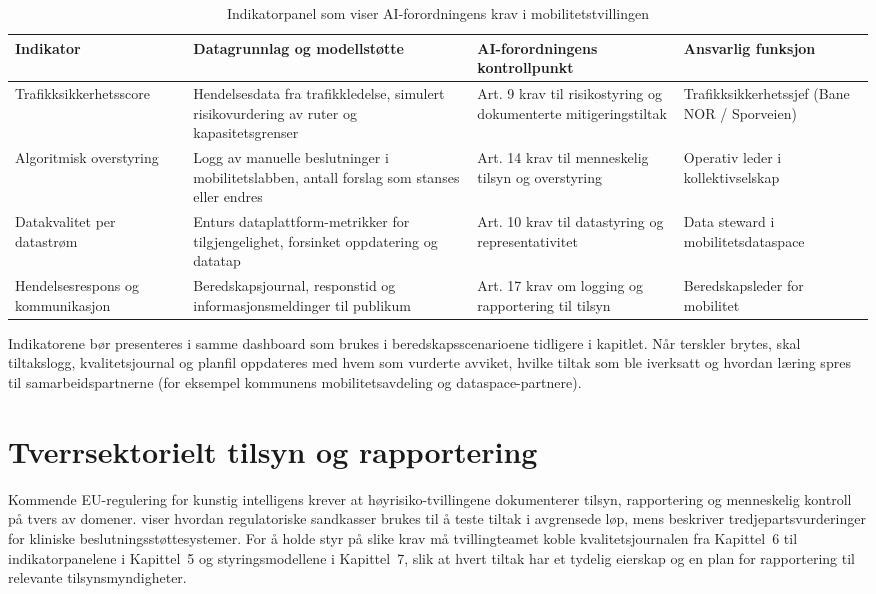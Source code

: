 \begin{table}[ht]
    \centering
    \caption{Indikatorpanel som viser AI-forordningens krav i mobilitetstvillingen}
    \label{tab:ai-mobilitet}
    \begin{tabular}{|p{3.2cm}|p{4.6cm}|p{4.6cm}|p{3.0cm}|}
        \hline
        \textbf{Indikator} & \textbf{Datagrunnlag og modellstøtte} & \textbf{AI-forordningens kontrollpunkt} & \textbf{Ansvarlig funksjon} \\
        \hline
        Trafikksikkerhetsscore & Hendelsesdata fra trafikkledelse, simulert risikovurdering av ruter og kapasitetsgrenser \citep{banenor2024digitalspor} & Art. 9 krav til risikostyring og dokumenterte mitigeringstiltak \citep{eu2024aiact} & Trafikksikkerhetssjef (Bane NOR / Sporveien) \\
        \hline
        Algoritmisk overstyring & Logg av manuelle beslutninger i mobilitetslabben, antall forslag som stanses eller endres \citep{ruter2024mobilitetslab} & Art. 14 krav til menneskelig tilsyn og overstyring \citep{eu2024aiact} & Operativ leder i kollektivselskap \\
        \hline
        Datakvalitet per datastrøm & Enturs dataplattform-metrikker for tilgjengelighet, forsinket oppdatering og datatap \citep{entur2023dataplattform} & Art. 10 krav til datastyring og representativitet \citep{eu2024aiact} & Data steward i mobilitetsdataspace \\
        \hline
        Hendelsesrespons og kommunikasjon & Beredskapsjournal, responstid og informasjonsmeldinger til publikum \citep{vegvesen2023beredskap} & Art. 17 krav om logging og rapportering til tilsyn \citep{eu2024aiact} & Beredskapsleder for mobilitet \\
        \hline
    \end{tabular}
\end{table}

Indikatorene bør presenteres i samme dashboard som brukes i beredskapsscenarioene tidligere i kapitlet. Når terskler brytes, skal tiltakslogg, kvalitetsjournal og planfil oppdateres med hvem som vurderte avviket, hvilke tiltak som ble iverksatt og hvordan læring spres til samarbeidspartnerne (for eksempel kommunens mobilitetsavdeling og dataspace-partnere).

\section{Tverrsektorielt tilsyn og rapportering}
Kommende EU-regulering for kunstig intelligens krever at høyrisiko-tvillingene dokumenterer tilsyn, rapportering og menneskelig kontroll på tvers av domener. \citet{datatilsynet2023sandkasse} viser hvordan regulatoriske sandkasser brukes til å teste tiltak i avgrensede løp, mens \citet{ehelse2024tilsyn} beskriver tredjepartsvurderinger for kliniske beslutningsstøttesystemer. For å holde styr på slike krav må tvillingteamet koble kvalitetsjournalen fra Kapittel~6 til indikatorpanelene i Kapittel~5 og styringsmodellene i Kapittel~7, slik at hvert tiltak har et tydelig eierskap og en plan for rapportering til relevante tilsynsmyndigheter.

